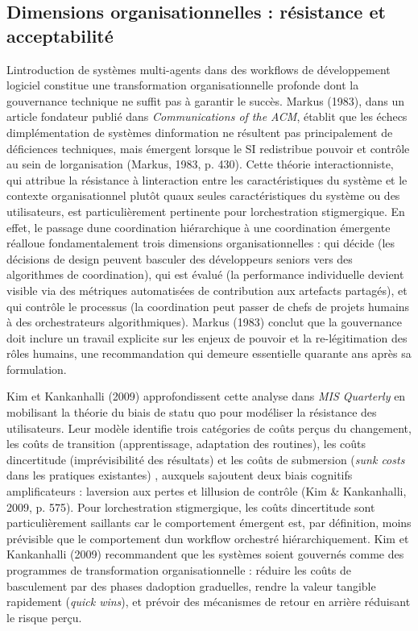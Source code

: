 \documentclass[12pt,a4paper]{article}
\begin{document}
\subsection{Dimensions organisationnelles : résistance et
acceptabilité}\label{dimensions-organisationnelles--ruxe9sistance-et-acceptabilituxe9}

L\textquotesingle introduction de systèmes multi-agents dans des
workflows de développement logiciel constitue une transformation
organisationnelle profonde dont la gouvernance technique ne suffit pas à
garantir le succès. Markus (1983), dans un article fondateur publié dans
\emph{Communications of the ACM}, établit que les échecs
d\textquotesingle implémentation de systèmes
d\textquotesingle information ne résultent pas principalement de
déficiences techniques, mais émergent lorsque le SI redistribue pouvoir
et contrôle au sein de l\textquotesingle organisation (Markus, 1983, p.
430). Cette théorie interactionniste, qui attribue la résistance à
l\textquotesingle interaction entre les caractéristiques du système et
le contexte organisationnel plutôt qu\textquotesingle aux seules
caractéristiques du système ou des utilisateurs, est particulièrement
pertinente pour l\textquotesingle orchestration stigmergique. En effet,
le passage d\textquotesingle une coordination hiérarchique à une
coordination émergente réalloue fondamentalement trois dimensions
organisationnelles : qui décide (les décisions de design peuvent
basculer des développeurs seniors vers des algorithmes de coordination),
qui est évalué (la performance individuelle devient visible via des
métriques automatisées de contribution aux artefacts partagés), et qui
contrôle le processus (la coordination peut passer de chefs de projets
humains à des orchestrateurs algorithmiques). Markus (1983) conclut que
la gouvernance doit inclure un travail explicite sur les enjeux de
pouvoir et la re-légitimation des rôles humains, une recommandation qui
demeure essentielle quarante ans après sa formulation.

Kim et Kankanhalli (2009) approfondissent cette analyse dans \emph{MIS
Quarterly} en mobilisant la théorie du biais de statu quo pour modéliser
la résistance des utilisateurs. Leur modèle identifie trois catégories
de coûts perçus du changement, les coûts de transition
(apprentissage, adaptation des routines), les coûts
d\textquotesingle incertitude (imprévisibilité des résultats) et les
coûts de submersion (\emph{sunk costs} dans les pratiques existantes)
, auxquels s\textquotesingle ajoutent deux biais cognitifs
amplificateurs : l\textquotesingle aversion aux pertes et
l\textquotesingle illusion de contrôle (Kim \& Kankanhalli, 2009, p.
575). Pour l\textquotesingle orchestration stigmergique, les coûts
d\textquotesingle incertitude sont particulièrement saillants car le
comportement émergent est, par définition, moins prévisible que le
comportement d\textquotesingle un workflow orchestré hiérarchiquement.
Kim et Kankanhalli (2009) recommandent que les systèmes soient gouvernés
comme des programmes de transformation organisationnelle : réduire les
coûts de basculement par des phases d\textquotesingle adoption
graduelles, rendre la valeur tangible rapidement (\emph{quick wins}), et
prévoir des mécanismes de retour en arrière réduisant le risque perçu.
\end{document}
